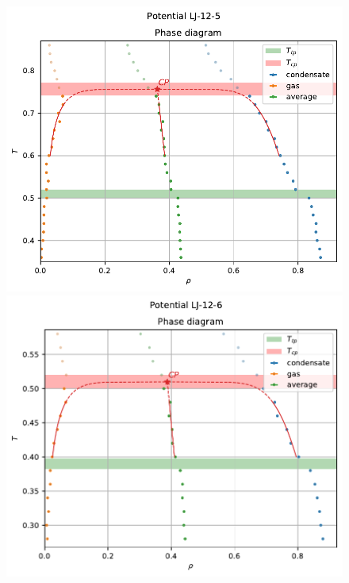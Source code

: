 \documentclass[pdf,hyperref={unicode}]{beamer}
\begin{document}
\begin{frame}
\begin{columns}
\begin{column}{0.55\linewidth}
{\begin{figure}[h]
\begin{center}
\begin{minipage}[h]{0.47\linewidth}
\includegraphics[width=\textwidth, keepaspectratio]{plot_phase_diagram_Potential LJ-12-5_1}
\end{minipage}
\begin{minipage}[h]{0.47\linewidth}
\includegraphics[width=\textwidth, keepaspectratio]{plot_phase_diagram_Potential LJ-12-6_1}
\end{minipage}
\label{risPhaseDiagrammExp}
\end{center}
\end{figure}
}
\end{column}


\end{columns}
\end{frame}
\end{document}
